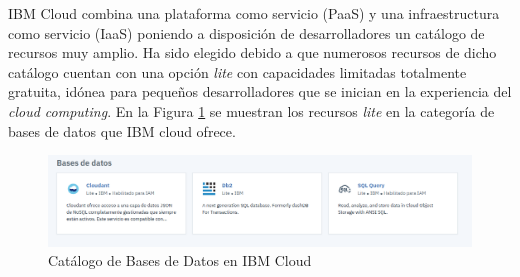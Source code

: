 IBM Cloud combina una plataforma como servicio (\gls{PaaS}) y una infraestructura como servicio (\gls{IaaS}) poniendo a disposición de desarrolladores un catálogo de recursos muy amplio. Ha sido elegido debido a que numerosos recursos de dicho catálogo cuentan con una opción \textit{lite} con capacidades limitadas totalmente gratuita, idónea para pequeños desarrolladores que se inician en la experiencia del \textit{cloud computing}. En la Figura \ref{fig:catalogoIBM} se muestran los recursos \textit{lite} en la categoría de bases de datos que IBM cloud ofrece.
\begin{figure}[H]
            \centering
            \includegraphics[width=14cm]{figs/db_ibm.png}
            \caption{Catálogo de Bases de Datos en IBM Cloud}
            \label{fig:catalogoIBM}
\end{figure}

